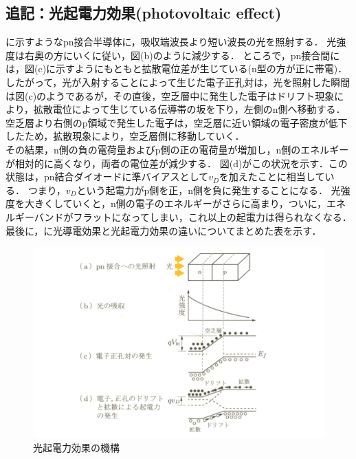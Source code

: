 \subsection{追記：光起電力効果(photovoltaic effect)\cite{113002054832640}}
\label{photovoltaic-effect}
に示すようなpn接合半導体に，吸収端波長より短い波長の光を照射する．
光強度は右奥の方にいくに従い，図(b)のように減少する．
ところで，pn接合間には，図(c)に示すようにもともと拡散電位差が生じている(n型の方が正に帯電)．
したがって，光が入射することによって生じた電子正孔対は，光を照射した瞬間は図(c)のようであるが，その直後，空乏層中に発生した電子はドリフト現象により，拡散電位によって生じている伝導帯の坂を下り，左側のn側へ移動する．\\
空乏層より右側のp領域で発生した電子は，空乏層に近い領域の電子密度が低下したため，拡散現象により，空乏層側に移動していく．\\
その結果，n側の負の電荷量およびp側の正の電荷量が増加し，n側のエネルギーが相対的に高くなり，両者の電位差が減少する．
図(d)がこの状況を示す．この状態は，pn結合ダイオードに準バイアスとして$v_{D}$を加えたことに相当している．
つまり，$v_{D}$という起電力がp側を正，n側を負に発生することになる．
光強度を大きくしていくと，n側の電子のエネルギーがさらに高まり，ついに，エネルギーバンドがフラットになってしまい，これ以上の起電力は得られなくなる．
最後に，に光導電効果と光起電力効果の違いについてまとめた表を示す．

\begin{figure}[h]
	\centering
	\includegraphics[scale=0.45]{./fig/pnl.png}
	\caption{光起電力効果の機構\cite{113002054832640}}
	\label{fig:pnl}
\end{figure}

